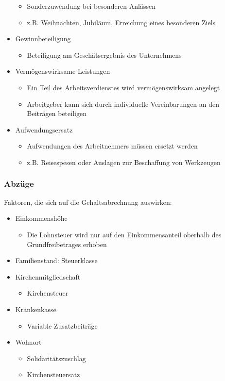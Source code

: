 \begin{itemize}
\begin{itemize}
			\item Sonderzuwendung bei besonderen Anlässen
			\item z.B. Weihnachten, Jubiläum, Erreichung eines besonderen Ziels
		\end{itemize}
	\item Gewinnbeteiligung
		\begin{itemize}
			\item Beteiligung am Geschätsergebnis des Unternehmens
		\end{itemize}
	\item Vermögenswirksame Leistungen
		\begin{itemize}
			\item Ein Teil des Arbeitsverdienstes wird vermögenswirksam angelegt
			\item Arbeitgeber kann sich durch individuelle Vereinbarungen an den Beiträgen beteiligen
		\end{itemize}
	\item Aufwendungsersatz
		\begin{itemize}
			\item Aufwendungen des Arbeitnehmers müssen ersetzt werden
			\item z.B. Reisespesen oder Auslagen zur Beschaffung von Werkzeugen
		\end{itemize}
\end{itemize}

\subsubsection{Abzüge}
Faktoren, die sich auf die Gehaltsabrechnung auswirken:
\begin{itemize}
	\item Einkommenshöhe
		\begin{itemize}
			\item Die Lohnsteuer wird nur auf den Einkommensanteil oberhalb des Grundfreibetrages erhoben
		\end{itemize}
	\item Familienstand: Steuerklasse
	\item Kirchenmitgliedschaft
		\begin{itemize}
			\item Kirchensteuer
		\end{itemize}
	\item Krankenkasse
		\begin{itemize}
			\item Variable Zusatzbeiträge
		\end{itemize}
	\item Wohnort
		\begin{itemize}
			\item Solidaritätszuschlag
			\item Kirchensteuersatz
		\end{itemize}
\end{itemize}


